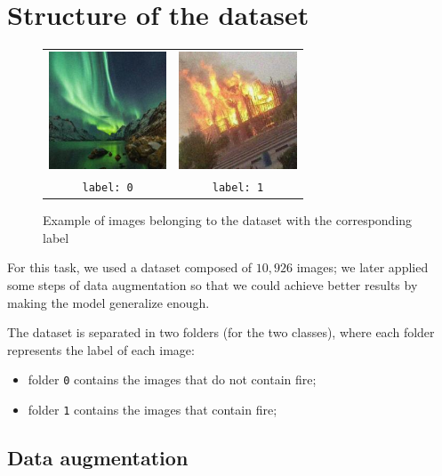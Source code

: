 \documentclass[11pt, journal]{IEEEtran}
\newcommand{\nl}{

\medskip

}
\begin{document}
\section{Structure of the dataset}

\begin{figure}
    \label{dataset_example}
    \centering
    \begin{tabular}{c c}
        \includegraphics[width = 3.5cm]{imgs/no_fire.jpg} & \includegraphics[width = 3.5cm]{imgs/fire.jpg}
        \\
        \texttt{label: 0} & \texttt{label: 1}
    \end{tabular}
    \caption{Example of images belonging to the dataset with the corresponding label}
\end{figure}

For this task, we used a dataset composed of $10,926$ images; we later applied some steps of data augmentation so that we could achieve better results by making the model generalize enough.
\nl
The dataset is separated in two folders (for the two classes), where each folder represents the label of each image:
\begin{itemize}
    \item folder \verb|0| contains the images that do not contain fire;
    \item folder \verb|1| contains the images that contain fire;
\end{itemize}

\subsection{Data augmentation}
\end{document}
